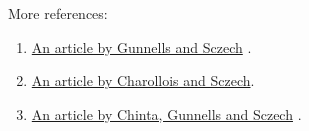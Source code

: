 \documentclass[11pt,a4paper,notitlepage]{article}
\begin{document}
More references:
\begin{enumerate}
\item \href{gunnells_sczech.pdf}{An article by Gunnells and Sczech} \cite{MR1980994}.
\item \href{Charollois-Sczech_EMS.pdf}{An article by Charollois and Sczech}\cite{MR3526308}. 
\item \href{0001011.pdf}{An article by Chinta, Gunnells and Sczech} \cite{MR1850609}.
\end{enumerate}

	
	
\end{document}
